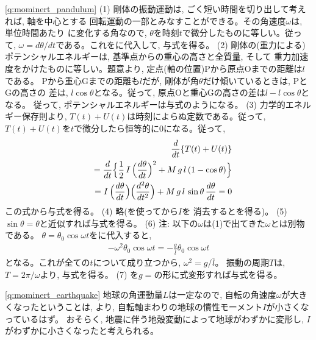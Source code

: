 \begin{q}
\ref{q:mominert_pandulum} 
(1) 剛体の振動運動は, ごく短い時間を切り出して考えれば, 軸を中心とする
回転運動の一部とみなすことができる。その角速度$\omega$は, 単位時間あたり
に変化する角なので, $\theta$を時刻$t$で微分したものに等しい。従って, 
$\omega=d\theta/dt$である。これをに代入して, 与式を得る。
(2) 剛体の(重力による)ポテンシャルエネルギーは, 基準点からの重心の高さと全質量, そして
重力加速度をかけたものに等しい。題意より, 定点(軸の位置)Pから原点Oまでの距離は$l$である。
Pから重心Gまでの距離も$l$だが, 剛体が角$\theta$だけ傾いているときは, PとGの高さの
差は, $l\cos\theta$となる。従って, 原点Oと重心Gの高さの差は$l-l\cos\theta$となる。
従って, ポテンシャルエネルギーは与式のようになる。
(3) 力学的エネルギー保存則より, $T(t)+U(t)$は時刻によらぬ定数である。従って, 
$T(t)+U(t)$を$t$で微分したら恒等的に0になる。従って,
\begin{eqnarray*}
&&\frac{d}{dt}\{T(t)+U(t)\}\\
&&=\frac{d}{dt}\Bigl\{\frac{1}{2}\,I\,\Bigl(\frac{d\theta}{dt}\Bigr)^2+M\,g\,l\,(1-\cos \theta)\Bigr\}\\
&&=I\,\Bigl(\frac{d\theta}{dt}\Bigr)\Bigl(\frac{d^2\theta}{dt^2}\Bigr)+M\,g\,l\,\sin \theta\,\frac{d\theta}{dt}=0
\end{eqnarray*}
この式から与式を得る。
(4) 略(を使ってから$I$を
消去するとを得る)。
(5) $\sin\theta=\theta$と近似すれば与式を得る。
(6) 注: 以下の$\omega$は(1)で出てきた$\omega$とは別物である。
$\theta=\theta_0 \cos \omega t$をに代入すると, 
\begin{eqnarray}
-\omega^2\theta_0 \cos \omega t=-\frac{g}{\overline{l}}\theta_0\cos\omega t
\end{eqnarray}
となる。これが全ての$t$について成り立つから, $\omega^2=g/\overline{l}$。
振動の周期$T$は, $T=2\pi/\omega$より, 与式を得る。
(7) を$g=$の形に式変形すれば与式を得る。
\end{q}
\mv

\ref{q:mominert_earthquake}
地球の角運動量$L$は一定なので, 自転の角速度$\omega$が大きくなったということは, 
より, 自転軸まわりの地球の慣性モーメント$I$が小さくなっているはず。
おそらく, 地震に伴う地殻変動によって地球がわずかに変形し, $I$がわずかに小さくなったと考えられる。
\mv



